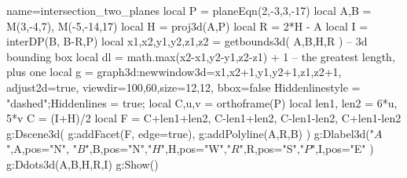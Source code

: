 \documentclass[12pt]{standalone}%
\begin{document}
\begin{luadraw}{name=intersection_two_planes}
local P = planeEqn(2,-3,3,-17)
local A,B = M(3,-4,7), M(-5,-14,17)
local H = proj3d(A,P)
local R = 2*H - A
local I = interDP({B, B-R},P)
local x1,x2,y1,y2,z1,z2 = getbounds3d( {A,B,H,R} ) -- 3d bounding box
local dl = math.max(x2-x1,y2-y1,z2-z1) + 1 -- the greatest length, plus one
local g = graph3d:new{window3d={x1,x2+1,y1,y2+1,z1,z2+1}, adjust2d=true, viewdir={100,60},size={12,12}, bbox=false}
Hiddenlinestyle = "dashed";Hiddenlines = true;
local C,u,v = orthoframe(P)
local len1, len2 = 6*u, 5*v
C = (I+H)/2
local F = {C+len1+len2, C-len1+len2, C-len1-len2, C+len1-len2}
g:Dscene3d(
    g:addFacet(F, {edge=true}),
    g:addPolyline({{A,R,B}})
)
g:Dlabel3d("$A$",A,{pos="N"}, "$B$",B,{pos="N"},"$H$",H,{pos="W"},"$R$",R,{pos="S"},"$P$",I,{pos="E"} )
g:Ddots3d({A,B,H,R,I})
g:Show()
\end{luadraw} 
\end{document}
